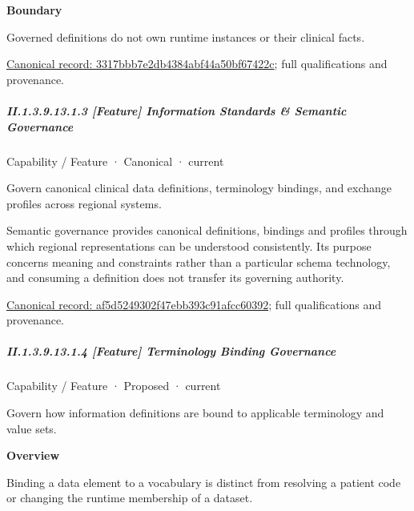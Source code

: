 \textbf{Boundary}



Governed definitions do not own runtime instances or their clinical facts.


{\footnotesize \href{../../../../../../../continuum/strategy/capability/feature/3317bbb7e2db4384abf44a50bf67422c.md}{Canonical record: 3317bbb7e2db4384abf44a50bf67422c}; full qualifications and provenance.}\par
\subparagraph*{II.1.3.9.13.1.3 [Feature] Information Standards \& Semantic Governance}
\label{navigation:II.1.3.9.13.1.3}

\label{element:af5d5249302f47ebb393c91afcc60392}
{\small Capability / Feature · Canonical · current}\par

Govern canonical clinical data definitions, terminology bindings, and exchange profiles across regional systems.



Semantic governance provides canonical definitions, bindings and profiles through which regional representations can be understood consistently. Its purpose concerns meaning and constraints rather than a particular schema technology, and consuming a definition does not transfer its governing authority.


{\footnotesize \href{../../../../../../../continuum/strategy/capability/feature/af5d5249302f47ebb393c91afcc60392.md}{Canonical record: af5d5249302f47ebb393c91afcc60392}; full qualifications and provenance.}\par
\subparagraph*{II.1.3.9.13.1.4 [Feature] Terminology Binding Governance}
\label{navigation:II.1.3.9.13.1.4}

\label{element:b999df692ca64010b4adeedbcb0d3a5a}
{\small Capability / Feature · Proposed · current}\par

Govern how information definitions are bound to applicable terminology and value sets.



\textbf{Overview}



Binding a data element to a vocabulary is distinct from resolving a patient code or changing the runtime membership of a dataset.



